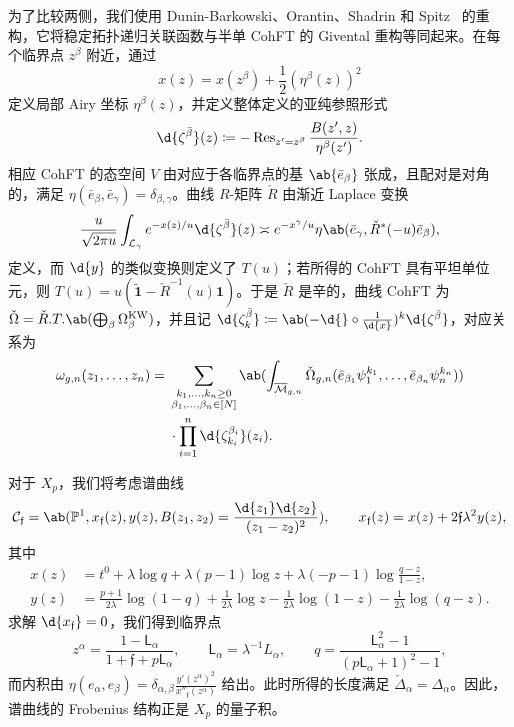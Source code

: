 \documentclass{amsart}
\theoremstyle{definition}
\theoremstyle{remark}
\theoremstyle{plain}
\theoremstyle{definition}
\theoremstyle{remark}
\renewcommand{\P}{\mathbb{P}}
\newcommand{\Mbar}{\overline{\mathcal{M}}}
\newcommand{\mc}[1]{\mathcal{#1}}
\newcommand{\mf}[1]{\mathfrak{#1}}
\newcommand{\mr}[1]{\mathrm{#1}}
\newcommand{\on}[1]{\operatorname{#1}}
\newcommand{\ms}[1]{\mathsf{#1}}
\newcommand{\wt}[1]{\widetilde{#1}}
\newcommand{\1}{\mathbf{1}}
\newcommand{\2}{\mathbf{2}}
\newcommand{\3}{\mathbf{3}}
\begin{document}
为了比较两侧，我们使用 Dunin-Barkowski、Orantin、Shadrin 和 Spitz~\cite{DOSS2014} 的重构，它将稳定拓扑递归关联函数与半单 CohFT 的 Givental 重构等同起来。在每个临界点 \(z^{\beta}\) 附近，通过
\[ x(z) = x(z^{\beta}) + \frac{1}{2}(\eta^{\beta}(z))^2 \]
定义局部 Airy 坐标 \(\eta^{\beta}(z)\)，并定义整体定义的亚纯参照形式
\[ \d{\zeta^{\bar{\beta}}}(z) \coloneqq -\on{Res}_{z'=z^{\beta}}\frac{B(z',z)}{\eta^{\beta}(z')}. \]
相应 CohFT 的态空间 \(V\) 由对应于各临界点的基 \(\ab\{\bar{e}_{\beta}\}\) 张成，且配对是对角的，满足 \(\eta(\bar{e}_{\beta},\bar{e}_{\gamma}) = \delta_{\beta,\gamma}\)。曲线 \(R\)-矩阵 \(\check{R}\) 由渐近 Laplace 变换
\[ \frac{u}{\sqrt{2\pi u}}\int_{\mc{L}_{\gamma}} e^{-x(z)/u}\d{\zeta^{\bar{\beta}}}(z) \asymp e^{-x^{\gamma}/u}\eta\ab(\bar{e}_{\gamma}, \check{R}^*(-u)\bar{e}_{\beta}), \]
定义，而 \(\d{y}\) 的类似变换则定义了 \(T(u)\)；若所得的 CohFT 具有平坦单位元，则 \(T(u) = u(\wt{\1}-\check{R}^{-1}(u)\1)\)。于是 \(\check{R}\) 是辛的，曲线 CohFT 为 \(\check{\Omega} = \check{R}.T.\ab(\bigoplus_{\beta}\Omega^{\mr{KW}}_{\beta})\)，并且记 \(\d{\zeta^{\bar{\beta}}_k} \coloneqq \ab(-\d{} \circ \frac{1}{\d{x}})^k \d{\zeta^{\bar{\beta}}}\)，对应关系为
\begin{align*}
    \omega_{g,n}(z_1,\ldots,z_n) ={}& \sum_{\substack{k_1,\ldots,k_n \geq 0 \\ \beta_1,\ldots,\beta_n \in [N]}}\ab(\int_{\Mbar_{g,n}} \check{\Omega}_{g,n}(\bar{e}_{\beta_1}\psi_1^{k_1},\ldots,\bar{e}_{\beta_n}\psi_n^{k_n})) \\
    &\cdot \prod_{i=1}^n \d{\zeta^{\beta_i}_{k_i}}(z_i).
\end{align*}

对于 \(X_p\)，我们将考虑谱曲线
\[ \mc{C}_{\mf{f}} = \ab(\P^1, x_{\mf{f}}(z), y(z), B(z_1,z_2) = \frac{\d{z_1}\d{z_2}}{(z_1-z_2)^2}), \qquad x_{\mf{f}}(z) = x(z) + 2\mf{f}\lambda^2 y(z), \]
其中
\begin{align*}
    x(z) &= t^0 + \lambda \log q + \lambda(p-1)\log z + \lambda(-p-1)\log\frac{q-z}{1-z}, \\
    y(z) &= \frac{p+1}{2\lambda}\log(1-q) + \frac{1}{2\lambda}\log z - \frac{1}{2\lambda}\log(1-z) - \frac{1}{2\lambda}\log(q-z).
\end{align*}
求解 \(\d{x_{\mf{f}}} = 0\)，我们得到临界点
\[ z^{\alpha} = \frac{1-\ms{L}_{\alpha}}{1+\mf{f}+p\ms{L}_{\alpha}}, \qquad \ms{L}_{\alpha} = \lambda^{-1}L_{\alpha}, \qquad q = \frac{\ms{L}_{\alpha}^2-1}{(p\ms{L}_{\alpha}+1)^2-1}, \]
而内积由 \(\eta(e_{\alpha},e_{\beta}) = \delta_{\alpha,\beta}\frac{y'(z^{\alpha})^2}{x''_{\mf{f}}(z^{\alpha})}\) 给出。此时所得的长度满足 \(\check{\Delta}_{\alpha} = \Delta_{\alpha}\)。因此，谱曲线的 Frobenius 结构正是 \(X_p\) 的量子积。
\end{document}
